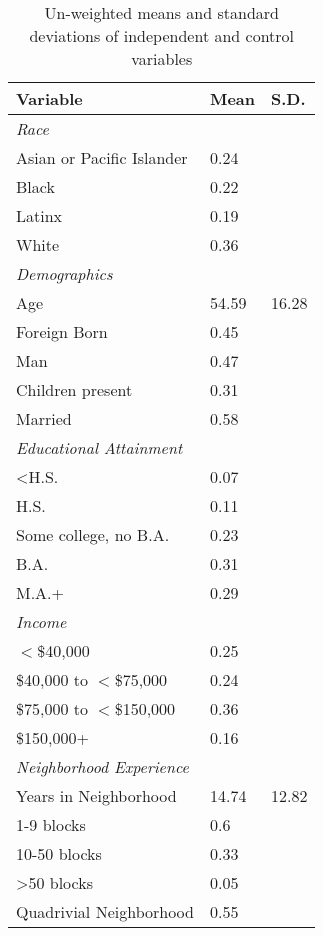 \begin{table}[ht]
\centering
\caption{Un-weighted means and standard deviations of independent and control variables} 
\label{tab:descriptives}
\begin{tabular}{lp{.5in}p{.5in}}
  \toprule
Variable & Mean & S.D. \\ 
  \midrule
\emph{Race}&&\\Asian or Pacific Islander & 0.24 &  \\ 
  Black & 0.22 &  \\ 
  Latinx & 0.19 &  \\ 
  White & 0.36 &  \\ 
  \emph{Demographics}&&\\Age & 54.59 & 16.28 \\ 
  Foreign Born & 0.45 &  \\ 
  Man & 0.47 &  \\ 
  Children present & 0.31 &  \\ 
  Married & 0.58 &  \\ 
  \emph{Educational Attainment}&&\\<H.S. & 0.07 &  \\ 
  H.S. & 0.11 &  \\ 
  Some college, no B.A. & 0.23 &  \\ 
  B.A. & 0.31 &  \\ 
  M.A.+ & 0.29 &  \\ 
  \emph{Income}&&\\$<$\$40,000 & 0.25 &  \\ 
  \$40,000 to $<$\$75,000 & 0.24 &  \\ 
  \$75,000 to $<$\$150,000 & 0.36 &  \\ 
  \$150,000+ & 0.16 &  \\ 
  \emph{Neighborhood Experience}\\Years in Neighborhood & 14.74 & 12.82 \\ 
  1-9 blocks & 0.6 &  \\ 
  10-50 blocks & 0.33 &  \\ 
  >50 blocks & 0.05 &  \\ 
  Quadrivial Neighborhood & 0.55 &  \\ 
   \bottomrule
\end{tabular}
\end{table}
